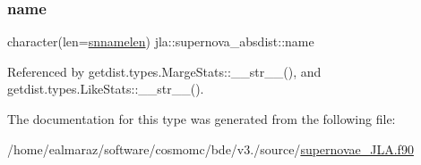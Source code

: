 \mbox{\label{structjla_1_1supernova__absdist_a73c00a54d10c5d7d9fe9e383f29c1c66}} 
\subsubsection{\texorpdfstring{name}{name}}
{\footnotesize\ttfamily character(len=\mbox{\hyperlink{namespacejla_a211c3f57dbbc51d6959058d935cc0fb6}{snnamelen}}) jla\+::supernova\+\_\+absdist\+::name\hspace{0.3cm}{\ttfamily [private]}}



Referenced by getdist.\+types.\+Marge\+Stats\+::\+\_\+\+\_\+str\+\_\+\+\_\+(), and getdist.\+types.\+Like\+Stats\+::\+\_\+\+\_\+str\+\_\+\+\_\+().



The documentation for this type was generated from the following file\+:\begin{DoxyCompactItemize}
\item 
/home/ealmaraz/software/cosmomc/bde/v3./source/\mbox{\hyperlink{supernovae__JLA_8f90}{supernovae\+\_\+\+J\+L\+A.\+f90}}\end{DoxyCompactItemize}
